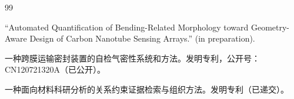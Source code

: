 
\begin{publications}{99}

    \item ``Automated Quantification of Bending-Related Morphology toward Geometry-Aware Design of Carbon Nanotube Sensing Arrays.'' (in preparation).


    \item {\raggedright 一种跨膜运输密封装置的自检气密性系统和方法。发明专利，公开号：CN120721320A（已公开）。\par}

    \item {\raggedright 一种面向材料科研分析的关系约束证据检索与组织方法。发明专利（已递交）。\par}

    
\end{publications}
